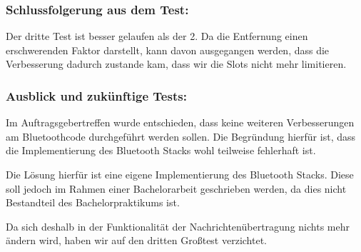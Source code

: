 \subsubsection{Schlussfolgerung aus dem
Test:}\label{schlussfolgerung-aus-dem-test-4}

Der dritte Test ist besser gelaufen als der 2. Da die Entfernung einen
erschwerenden Faktor darstellt, kann davon ausgegangen werden, dass die
Verbesserung dadurch zustande kam, dass wir die Slots nicht mehr
limitieren.

\subsubsection{Ausblick und zukünftige
Tests:}\label{ausblick-und-zukuxfcnftige-tests}

Im Auftragsgebertreffen wurde entschieden, dass keine weiteren
Verbesserungen am Bluetoothcode durchgeführt werden sollen. Die Begründung
hierfür ist, dass die Implementierung des Bluetooth Stacks wohl
teilweise fehlerhaft ist.

Die Lösung hierfür ist eine eigene Implementierung des Bluetooth Stacks.
Diese soll jedoch im Rahmen einer Bachelorarbeit geschrieben werden, da
dies nicht Bestandteil des Bachelorpraktikums ist.

Da sich deshalb in der Funktionalität der Nachrichtenübertragung nichts
mehr ändern wird, haben wir auf den dritten Großtest verzichtet.
